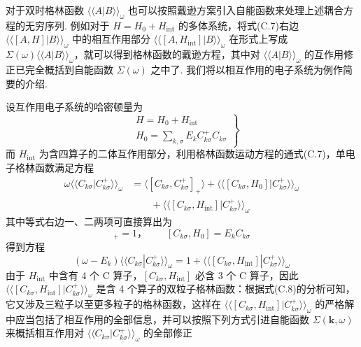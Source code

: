 对于双时格林函数 $\langle\langle A|B\rangle\rangle_{\omega}$ 也可以按照戴逊方案引入自能函数来处理上述耦合方程的无穷序列. 例如对于 $H=H_{0}+H_{\mathrm{int}}$ 的多体系统，将式(C.7)右边 $\langle\langle[A,H]|B\rangle\rangle_{\omega}$ 中的相互作用部分 $\langle\langle[A,H_{\mathrm{int}}]|B\rangle\rangle_{\omega}$ 在形式上写成 $\Sigma(\omega)\langle\langle A|B\rangle\rangle_{\omega}$，就可以得到格林函数的戴逊方程，其中对 $\langle\langle A|B\rangle\rangle_{\omega}$ 的互作用修正已完全概括到自能函数 $\Sigma(\omega)$ 之中了. 我们将以相互作用的电子系统为例作简要的介绍.

设互作用电子系统的哈密顿量为
\begin{equation}
\left.
\begin{aligned}
&H=H_{0}+H_{\mathrm{int}}\\
&H_{0}=\sum_{k,\sigma}E_{k}C_{k\sigma}^{+}C_{k\sigma}
\end{aligned}
\right\}
\end{equation}
而 $H_{\mathrm{int}}$ 为含四算子的二体互作用部分，利用格林函数运动方程的通式(C.7)，单电子格林函数满足方程
\begin{equation}
\begin{aligned}
\omega\langle\langle C_{k\sigma}|C_{k\sigma}^{+}\rangle\rangle_{\omega}
&=\langle[C_{k\sigma},C_{k\sigma}^{+}]_{+}\rangle
+\langle\langle[C_{k\sigma},H_{0}]|C_{k\sigma}^{+}\rangle\rangle_{\omega}\\
&\qquad+\langle\langle[C_{k\sigma},H_{\mathrm{int}}]
|C_{k\sigma}^{+}\rangle\rangle_{\omega}
\end{aligned}
\end{equation}
其中等式右边一、二两项可直接算出为
\begin{equation}
[C_{k\sigma},C_{k\sigma}^{+}]_{+}=1\text{，}\qquad
[C_{k\sigma},H_{0}]=E_{k}C_{k\sigma}
\end{equation}
得到方程
\begin{equation}
(\omega-E_{k})\langle\langle C_{k\sigma}
|C_{k\sigma}^{+}\rangle\rangle_{\omega}
=1+\langle\langle[C_{k\sigma},H_{\mathrm{int}}]
|C_{k\sigma}^{+}\rangle\rangle_{\omega}
\end{equation}
由于 $H_{\mathrm{int}}$ 中含有 4 个 C 算子，$[C_{k\sigma},H_{\mathrm{int}}]$ 必含 3 个 C 算子，因此 $\langle\langle[C_{k\sigma},H_{\mathrm{int}}]|C_{k\sigma}^{+}\rangle\rangle_{\omega}$ 是含 4 个算子的双粒子格林函数：根据式(C.8)的分析可知，它又涉及三粒子以至更多粒子的格林函数，这样在 $\langle\langle[C_{k\sigma},H_{\mathrm{int}}]|C_{k\sigma}^{+}\rangle\rangle_{\omega}$ 的严格解中应当包括了相互作用的全部信息，并可以按照下列方式引进自能函数 $\Sigma(\boldsymbol{k},\omega)$ 来概括相互作用对 $\langle\langle C_{k\sigma}|C_{k\sigma}^{+}\rangle\rangle_{\omega}$ 的全部修正
